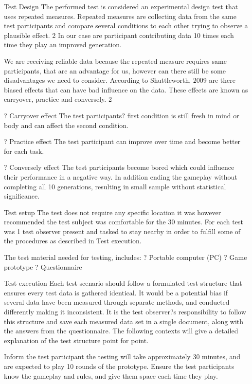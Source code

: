 Test Design  
The performed test is considered an experimental design test that uses repeated measures. 
Repeated measures are collecting data from the same test participants and compare several conditions to each other trying to observe a plausible effect. {2} In our case are participant contributing data 10 times each time they play an improved generation. 

We are receiving reliable data because the repeated measure requires same participants, that are an advantage for us, however can there still be some disadvantages we need to consider. According to Shuttleworth, 2009 are there biased effects that can have bad influence on the data. These effects are known as carryover, practice and conversely. {2}  

?	Carryover effect 
The test participants? first condition is still fresh in mind or body and can affect the second condition. 

?	Practice effect
The test participant can improve over time and become better for each task. 
	
?	Conversely effect 
The test participants become bored which could influence their performance in a negative way. In addition ending the gameplay without completing all 10 generations, resulting in small sample without statistical significance. 

Test setup
The test does not require any specific location it was however recommended the test subject was comfortable for the 30 minutes. For each test was 1 test observer present and tasked to stay nearby in order to fulfill some of the procedures as described in Test execution. 

The test material needed for testing, includes:
?	Portable computer (PC) 
?	Game prototype
?	Questionnaire 
  
Test execution
Each test scenario should follow a formulated test structure that ensures every test data is gathered identical. It would be a potential bias if several data have been measured through separate methods, and conducted differently making it inconsistent. It is the test observer?s responsibility to follow this structure and save each measured data set in a single document, along with the answers from the questionnaire.
The following contexts will give a detailed explanation of the test structure point for point.  

Inform the test participant the testing will take approximately 30 minutes, and are expected to play 10 rounds of the prototype. Ensure the test participants know the gameplay and rules, and give them space each time they play. 

